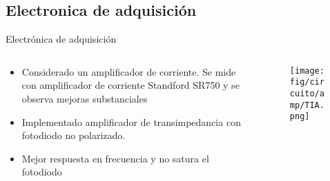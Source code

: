 \subsection{Electronica de adquisición}

\begin{frame}{Electrónica de adquisición}
\begin{columns}[c]
    \begin{column}{0.5\textwidth}
        \begin{itemize}
        \item Considerado un amplificador de corriente. Se mide con amplificador de corriente Standford SR750 y se observa mejoras substanciales
        \item Implementado amplificador de transimpedancia con fotodiodo no polarizado. 
        \item Mejor respuesta en frecuencia y no satura el fotodiodo
        \end{itemize}
    \end{column}
    \begin{column}{0.4\textwidth}
        \begin{figure}[H]
        \centering
        \texttt{[image: fig/circuito/amp/TIA.png]}
        \label{fig:circuito/amp/TIA}
        \end{figure}
    \end{column}
\end{columns}



\end{frame}

